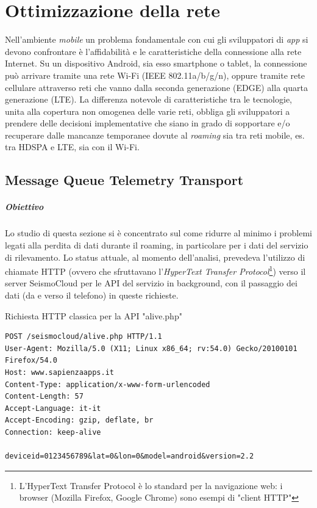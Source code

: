 \documentclass[a4paper,10pt]{memoir}
\begin{document}
\chapter{Ottimizzazione della rete}

Nell'ambiente \textit{mobile} un problema fondamentale con cui gli sviluppatori di \textit{app} si devono confrontare è l'affidabilità e le caratteristiche della connessione alla rete Internet. Su un dispositivo Android, sia esso smartphone o tablet, la connessione può arrivare tramite una rete Wi-Fi (IEEE 802.11a/b/g/n), oppure tramite rete cellulare attraverso reti che vanno dalla seconda generazione (EDGE) alla quarta generazione (LTE). La differenza notevole di caratteristiche tra le tecnologie, unita alla copertura non omogenea delle varie reti, obbliga gli sviluppatori a prendere delle decisioni implementative che siano in grado di sopportare e/o recuperare dalle mancanze temporanee dovute al \textit{roaming} sia tra reti mobile, es. tra HDSPA e LTE, sia con il Wi-Fi.

\section{Message Queue Telemetry Transport}

\paragraph{Obiettivo} Lo studio di questa sezione si è concentrato sul come ridurre al minimo i problemi legati alla perdita di dati durante il roaming, in particolare per i dati del servizio di rilevamento. Lo status attuale, al momento dell'analisi, prevedeva l'utilizzo di chiamate HTTP (ovvero che sfruttavano l'\textit{HyperText Transfer Protocol}\footnote{L'HyperText Transfer Protocol è lo standard per la navigazione web: i browser (Mozilla Firefox, Google Chrome) sono esempi di "client HTTP"}) verso il server SeismoCloud per le API del servizio in background, con il passaggio dei dati (da e verso il telefono) in queste richieste.

\begin{listing}[H]
\caption{Richiesta HTTP classica per la API "alive.php"}
\label{listing:httpreq}
\begin{verbatim}
POST /seismocloud/alive.php HTTP/1.1
User-Agent: Mozilla/5.0 (X11; Linux x86_64; rv:54.0) Gecko/20100101 Firefox/54.0
Host: www.sapienzaapps.it
Content-Type: application/x-www-form-urlencoded
Content-Length: 57
Accept-Language: it-it
Accept-Encoding: gzip, deflate, br
Connection: keep-alive

deviceid=0123456789&lat=0&lon=0&model=android&version=2.2
\end{verbatim}
\end{listing}
\end{document}
